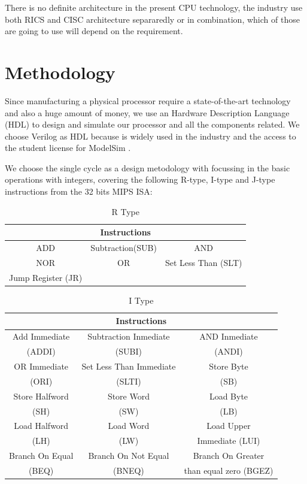 \documentclass[conference]{IEEEtran}
\begin{document}
There is no definite architecture in the present CPU technology, the industry use both RICS and CISC 
architecture separaredly or in combination, which of those are going to use will depend on the requirement.

\section{Methodology}	%

Since manufacturing a physical processor require a state-of-the-art technology and also a huge
amount of money, we use an Hardware Description Language (HDL) to design and simulate our
processor and all the components related. We choose Verilog \cite{b2} as HDL because is widely used in the 
industry and the access to the student license for ModelSim \cite{b3}.

We choose the single cycle as a design metodology with focussing in the basic operations with integers, 
covering the following R-type, I-type and J-type instructions from the 32 bits MIPS ISA:

\begin{table}[htbp]
\caption{R Type} %
\begin{center}
\begin{tabular}{|c|c|c|}
\hline
\multicolumn{3}{|c|}{\textbf{Instructions}} \\
\hline
ADD&Subtraction(SUB)&AND  \\
\hline
NOR&OR&Set Less Than (SLT) \\
\hline
Jump Register (JR)&& \\
\hline
\end{tabular}
\label{tab_rtype}
\end{center}
\end{table}

\begin{table}[htbp]
\caption{I Type} %
\begin{center}
\begin{tabular}{|c|c|c|}
\hline
\multicolumn{3}{|c|}{\textbf{Instructions}} \\
\hline
Add Immediate&Subtraction Inmediate & AND Inmediate \\
(ADDI) &(SUBI) & (ANDI) \\
\hline
OR Immediate&Set Less Than Immediate&  Store Byte \\
(ORI)&(SLTI)&(SB) \\
\hline
Store Halfword&Store Word&Load Byte \\
(SH)&(SW)&(LB)\\
\hline
Load Halfword&Load Word&Load Upper\\
(LH)&(LW)&Immediate (LUI)\\
\hline
Branch On Equal&Branch On Not Equal&Branch On Greater \\
(BEQ)&(BNEQ)&than equal zero (BGEZ)  \\
\hline
\end{tabular}
\label{tab_itype}
\end{center}
\end{table}
\end{document}
